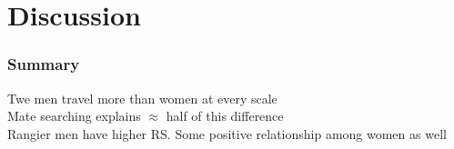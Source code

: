\documentclass{beamer}
\begin{document}











\section{Discussion}


\begin{frame}
\frametitle{Summary}

Twe men travel more than women at every scale \\
\vspace{0.75cm}
Mate searching explains $\approx$ half of this difference \\
\vspace{0.75cm} 
Rangier men have higher RS. Some positive relationship among women as well \\

\end{frame}
\end{document}
